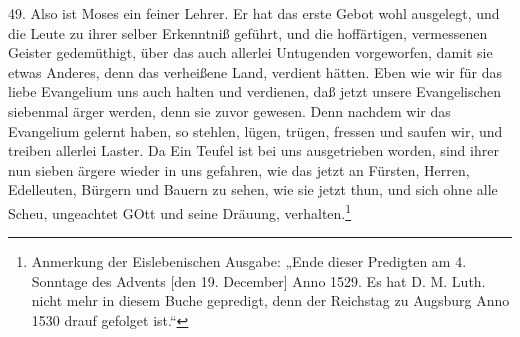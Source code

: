 49. Also ist Moses ein feiner Lehrer. Er hat das erste Gebot wohl ausgelegt, und die Leute zu ihrer selber Erkenntniß geführt, und die hoffärtigen, vermessenen Geister gedemüthigt, über das auch allerlei Untugenden vorgeworfen, damit sie etwas Anderes, denn das verheißene Land, verdient hätten. Eben wie wir für das liebe Evangelium uns auch halten und verdienen, daß jetzt unsere Evangelischen siebenmal ärger werden, denn sie zuvor gewesen. Denn nachdem wir das Evangelium gelernt haben, so stehlen, lügen, trügen, fressen und saufen wir, und treiben allerlei Laster. Da Ein Teufel ist bei uns ausgetrieben worden, sind ihrer nun sieben ärgere wieder in uns gefahren, wie das jetzt an Fürsten, Herren, Edelleuten, Bürgern und Bauern zu sehen, wie sie jetzt thun, und sich ohne alle Scheu, ungeachtet GOtt und seine Dräuung, verhalten.\footnote{Anmerkung der Eislebenischen Ausgabe: „Ende dieser Predigten am 4. Sonntage des Advents [den 19. December] Anno 1529. Es hat D. M. Luth. nicht mehr in diesem Buche gepredigt, denn der Reichstag zu Augsburg Anno 1530 drauf gefolget ist.“}
